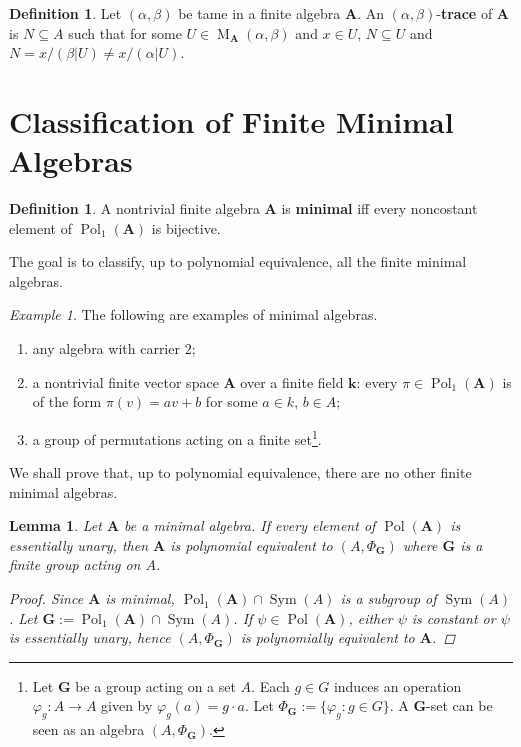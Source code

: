 \documentclass{amsart}
\theoremstyle{plain}
\newtheorem{lemma}[theorem]{Lemma}
\theoremstyle{definition}
\newtheorem{definition}[theorem]{Definition}
\theoremstyle{remark}
\newtheorem{example}[theorem]{Example}
\def\phi{\varphi}
\DeclareMathOperator{\Pol}{Pol}
\DeclareMathOperator{\Sym}{Sym}
\DeclareMathOperator{\M}{M}
\begin{document}
\begin{definition}
    Let $(\alpha, \beta)$ be tame in a finite algebra $\mathbf{A}$. 
    An $(\alpha, \beta)$-\textbf{trace} of $\mathbf{A}$ is $N \subseteq A$ such that for some $U \in \M_{\mathbf{A}}(\alpha, \beta)$ and $x \in U$, $N\subseteq U$ and $N=x/(\beta|U) \neq x/(\alpha|U)$. 
\end{definition}


\section{Classification of Finite Minimal Algebras}

\begin{definition}
    A nontrivial finite algebra $\mathbf{A}$ is \textbf{minimal} iff every noncostant element of $\Pol_1(\mathbf{A})$ is bijective.
\end{definition}

The goal is to classify, up to polynomial equivalence, all the finite minimal algebras. 

\begin{example}
    The following are examples of minimal algebras. 
    \begin{enumerate}
        \item any algebra with carrier $2$; 
        \item a nontrivial finite vector space $\mathbf{A}$ over a finite field $\mathbf{k}$: every $\pi \in \Pol_1(\mathbf{A})$ is of the form $\pi(v)=av+b$ for some $a \in k$, $b \in A$; 
        \item a group of permutations acting on a finite set\footnote{Let $\mathbf{G}$ be a group acting on a set $A$.  
        Each $g \in G$ induces an operation $\phi_g: A \to A$ given by $\phi_g(a)=g \cdot a$. 
        Let $\Phi_\mathbf{G}:=\{\phi_g: g \in G\}$. 
        A $\mathbf{G}$-set can be seen as an algebra $(A, \Phi_\mathbf{G})$.}.
    \end{enumerate}
\end{example}

We shall prove that, up to polynomial equivalence, there are no other finite minimal algebras. 

\begin{lemma}
    Let $\mathbf{A}$ be a minimal algebra.
    If every element of $\Pol(\mathbf{A})$ is essentially unary, then $\mathbf{A}$ is polynomial equivalent to $(A, \Phi_{\mathbf{G}})$ where $\mathbf{G}$ is a finite group acting on $A$. 
    \begin{proof}
        Since $\mathbf{A}$ is minimal, $\Pol_1(\mathbf{A}) \cap \Sym(A)$ is a subgroup of $\Sym(A)$. 
        Let $\mathbf{G}:=\Pol_1(\mathbf{A}) \cap \Sym(A)$. 
        If $\psi \in \Pol(\mathbf{A})$, either $\psi$ is constant or $\psi$ is essentially unary, hence $(A, \Phi_{\mathbf{G}})$ is polynomially equivalent to $\mathbf{A}$. 
    \end{proof}
\end{lemma}
\end{document}
